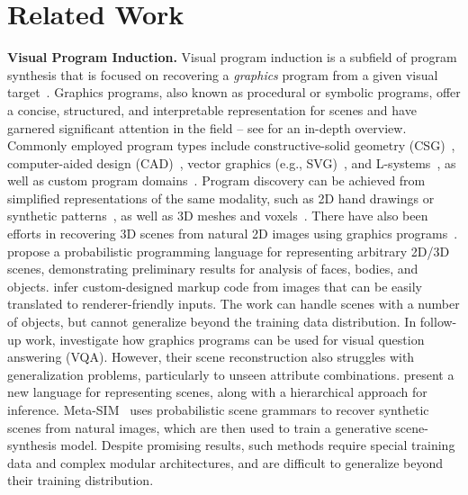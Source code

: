 \section{Related Work}\label{sec:related}

\noindent\textbf{Visual Program Induction.}
Visual program induction is a subfield of program synthesis that is focused on recovering a \emph{graphics} program from a given visual target~\citep{gulwani2017program}.
Graphics programs, also known as procedural or symbolic programs, offer a concise, structured, and interpretable representation for scenes and have garnered significant attention in the field -- see \citet{ritchie2023neurosymbolic} for an in-depth overview.
Commonly employed program types include constructive-solid geometry (CSG)~\citep{du2018inversecsg, kania2020ucsg, ren2022extrudenet, sharma2018csgnet, yu2022capri}, computer-aided design (CAD)~\cite{ganin2018synthesizing, li2020sketch2cad, li2022free2cad, seff2021vitruvion, xu2021inferring}, vector graphics (e.g., SVG)~\citep{reddy2021im2vec, reddy2021multi}, and L-systems~\citep{guo2020inverse}, as well as custom program domains~\citep{ellis2018learning, tian2019learning, deng2022unsupervised, hu2022inverse}.
Program discovery can be achieved from simplified representations of the same modality, such as 2D hand drawings or synthetic patterns~\citep{stava2010inverse, stava2014inverse, sharma2018csgnet, ellis2019write, riso2022pop, ganeshan2023improving, seff2021vitruvion}, as well as 3D meshes and voxels~\citep{ganeshan2023improving, jones2022plad, tian2019learning, bokeloh2010connection, willis2021fusion, sharma2018csgnet, ellis2019write}. 
There have also been efforts in recovering 3D scenes from natural 2D images using graphics programs~\citep{mansinghka2013approximate, kulkarni2015picture, wu2017neural, yi2018neural, mao2019neuro, liu2019learning, li2020multi, gothoskar20213dp3,ganin2018synthesizing, kar2019meta, devaranjan2020metasim2}. 
\citet{kulkarni2015picture} propose a probabilistic programming language for representing arbitrary 2D/3D scenes, demonstrating preliminary results for analysis of faces, bodies, and objects.
\citet{wu2017neural} infer custom-designed markup code from images that can be easily translated to renderer-friendly inputs.
The work can handle scenes with a number of objects, but cannot generalize beyond the training data distribution.
In follow-up work, \citet{yi2018neural} investigate how graphics programs can be used for visual question answering (VQA).
However, their scene reconstruction also struggles with generalization problems, particularly to unseen attribute combinations.
\citet{liu2019learning} present a new language for representing scenes, along with a hierarchical approach for inference.
Meta-SIM~\citep{kar2019meta, devaranjan2020metasim2} uses probabilistic scene grammars to recover synthetic scenes from natural images, which are then used to train a generative scene-synthesis model.
Despite promising results, such methods require special training data and complex modular architectures, and are difficult to generalize beyond their training distribution.

